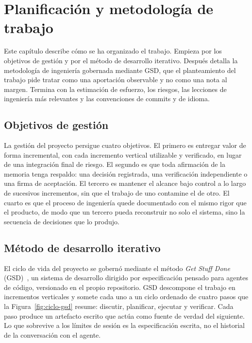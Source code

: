 \chapter{Planificación y metodología de trabajo}\label{cap:metodologia}

Este capítulo describe cómo se ha organizado el trabajo. Empieza por los objetivos de
gestión y por el método de desarrollo iterativo. Después detalla la metodología de ingeniería
gobernada mediante GSD, que el planteamiento del trabajo pide tratar como una aportación
observable y no como una nota al margen. Termina con la estimación de esfuerzo, los riesgos,
las lecciones de ingeniería más relevantes y las convenciones de commits y de idioma.

\section{Objetivos de gestión}\label{sec:met-objetivos-gestion}

La gestión del proyecto persigue cuatro objetivos. El primero es entregar valor de forma
incremental, con cada incremento vertical utilizable y verificado, en lugar de una
integración final de riesgo. El segundo es que toda afirmación de la memoria tenga respaldo:
una decisión registrada, una verificación independiente o una firma de aceptación. El tercero es
mantener el alcance bajo control a lo largo de sucesivos incrementos, sin que el trabajo de
uno contamine el de otro. El cuarto es que el proceso de ingeniería quede documentado con el
mismo rigor que el producto, de modo que un tercero pueda reconstruir no solo el sistema,
sino la secuencia de decisiones que lo produjo.

\section{Método de desarrollo iterativo}\label{sec:met-fases}

El ciclo de vida del proyecto se gobernó mediante el método \textit{Get Stuff Done}
(GSD)~\cite{gsd}, un sistema de desarrollo dirigido por especificación pensado para agentes de
código, versionado en el propio repositorio. GSD descompone el trabajo en incrementos
verticales y somete cada uno a un ciclo ordenado de cuatro pasos que la
Figura~\ref{fig:ciclo-gsd} resume: discutir, planificar, ejecutar y verificar. Cada paso
produce un artefacto escrito que actúa como fuente de verdad del siguiente. Lo que sobrevive
a los límites de sesión es la especificación escrita, no el historial de la conversación con
el agente.


